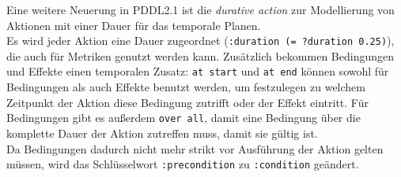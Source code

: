 Eine weitere Neuerung in \ac{PDDL}2.1 ist die \emph{durative action} zur Modellierung von Aktionen mit einer Dauer für das temporale Planen.\\
Es wird jeder Aktion eine Dauer zugeordnet (\verb|:duration (= ?duration 0.25)|), die auch für Metriken genutzt werden kann.
Zusätzlich bekommen Bedingungen und Effekte einen temporalen Zusatz: \verb|at start| und \verb|at end| können sowohl für Bedingungen als auch Effekte benutzt werden, um festzulegen zu welchem Zeitpunkt der Aktion diese Bedingung zutrifft oder der Effekt eintritt.
Für Bedingungen gibt es außerdem \verb|over all|, damit eine Bedingung über die komplette Dauer der Aktion zutreffen muss, damit sie gültig ist.\\
Da Bedingungen dadurch nicht mehr strikt vor Ausführung der Aktion gelten müssen, wird das Schlüsselwort \verb|:precondition| zu \verb|:condition| geändert.

